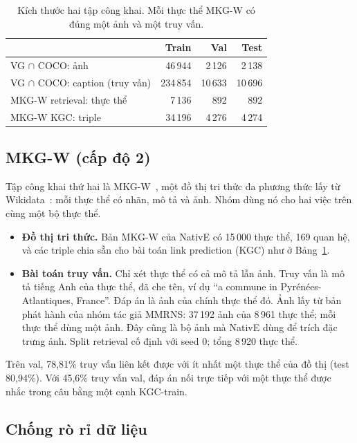 \begin{table}[t]
\centering
\caption{Kích thước hai tập công khai. Mỗi thực thể MKG-W có đúng một ảnh và một truy vấn.}
\label{tab:data}
\small
\begin{tabular}{lrrr}
\toprule
 & Train & Val & Test \\
\midrule
VG $\cap$ COCO: ảnh & 46\,944 & 2\,126 & 2\,138 \\
VG $\cap$ COCO: caption (truy vấn) & 234\,854 & 10\,633 & 10\,696 \\
\midrule
MKG-W retrieval: thực thể & 7\,136 & 892 & 892 \\
MKG-W KGC: triple & 34\,196 & 4\,276 & 4\,274 \\
\bottomrule
\end{tabular}
\end{table}

\subsection{MKG-W (cấp độ 2)}
\label{sec:data-mkgw}

Tập công khai thứ hai là MKG-W~\cite{xu2022mmrns}, một đồ thị tri thức đa phương thức lấy từ Wikidata~\cite{vrandecic2014wikidata}:
mỗi thực thể có nhãn, mô tả và ảnh. Nhóm dùng nó cho hai việc trên cùng một bộ thực thể.
\begin{itemize}
\item \textbf{Đồ thị tri thức.} Bản MKG-W của NativE có 15\,000 thực thể, 169 quan hệ, và các triple chia sẵn cho bài toán
link prediction (KGC) như ở Bảng~\ref{tab:data}.
\item \textbf{Bài toán truy vấn.} Chỉ xét thực thể có cả mô tả lẫn ảnh. Truy vấn là mô tả tiếng Anh của thực thể, đã che
tên, ví dụ ``a commune in Pyrénées-Atlantiques, France''. Đáp án là ảnh của chính thực thể đó. Ảnh lấy từ bản phát hành của
nhóm tác giả MMRNS: 37\,192 ảnh của 8\,961 thực thể; mỗi thực thể dùng một ảnh. Đây cũng là bộ ảnh mà NativE dùng để trích
đặc trưng ảnh. Split retrieval cố định với seed 0; tổng 8\,920 thực thể.
\end{itemize}
Trên val, 78,81\% truy vấn liên kết được với ít nhất một thực thể của đồ thị (test 80,94\%). Với 45,6\% truy vấn val, đáp án
nối trực tiếp với một thực thể được nhắc trong câu bằng một cạnh KGC-train.

\subsection{Chống rò rỉ dữ liệu}
\label{sec:leakage}

